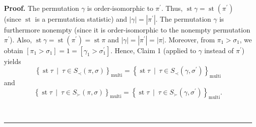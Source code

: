 \documentclass[numbers=enddot,12pt,final,onecolumn,notitlepage]{scrartcl}%
\theoremstyle{definition}
\newenvironment{proof}[1][Proof]{\noindent\textbf{#1.} }{\ \rule{0.5em}{0.5em}}
\newenvironment{verlong}{}{}
\begin{document}
\begin{verlong}
\begin{proof}
The permutation $\gamma$ is order-isomorphic to $\pi^{\prime}$. Thus,
$\operatorname{st} \gamma = \operatorname{st}\left( \pi^{\prime}\right)  $
(since $\operatorname{st}$ is a permutation statistic)
and $\left\vert \gamma\right\vert =\left\vert \pi^{\prime}\right\vert $. The
permutation $\gamma$ is furthermore nonempty (since it is order-isomorphic to
the nonempty permutation $\pi^{\prime}$). Also, $\operatorname{st}
\gamma =\operatorname{st}\left(  \pi^{\prime}\right)
=\operatorname{st} \pi   $ and $\left\vert \gamma\right\vert
=\left\vert \pi^{\prime}\right\vert =\left\vert \pi\right\vert $. Moreover,
from $\pi_{1}>\sigma_{1}$, we obtain $\left[  \pi_{1}>\sigma_{1}\right]
=1=\left[  \gamma_{1}>\sigma_{1}^{\prime}\right]  $. Hence, Claim 1 (applied
to $\gamma$ instead of $\pi^{\prime}$) yields
\begin{equation}
\left\{  \operatorname{st} \tau   \ \mid\ \tau\in S_{\prec
}\left(  \pi,\sigma\right)  \right\}  _{\operatorname*{multi}}=\left\{
\operatorname{st} \tau   \ \mid\ \tau\in S_{\prec}\left(
\gamma,\sigma^{\prime}\right)  \right\}  _{\operatorname*{multi}}
\label{pf.lem.LRcomp.head-l2.c4.pf.5}%
\end{equation}
and%
\begin{equation}
\left\{  \operatorname{st} \tau   \ \mid\ \tau\in S_{\succ
}\left(  \pi,\sigma\right)  \right\}  _{\operatorname*{multi}}=\left\{
\operatorname{st} \tau   \ \mid\ \tau\in S_{\succ}\left(
\gamma,\sigma^{\prime}\right)  \right\}  _{\operatorname*{multi}}.
\label{pf.lem.LRcomp.head-l2.c4.pf.6}%
\end{equation}



\end{proof}
\end{verlong}
\end{document}
